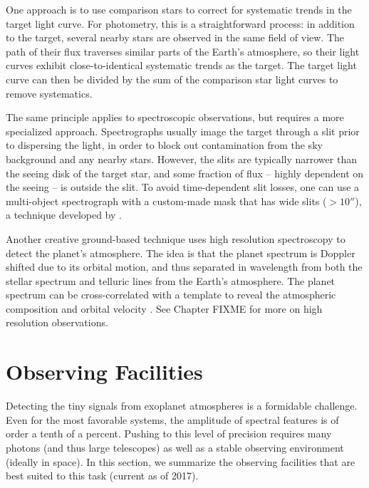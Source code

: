 \documentclass[graybox,natbib,nosecnum]{svmult}
\begin{document}
One approach is to use comparison stars to correct for systematic trends in the target light curve. For photometry, this is a straightforward process: in addition to the target, several nearby stars are observed in the same field of view. The path of their flux traverses similar parts of the Earth's atmosphere, so their light curves exhibit close-to-identical systematic trends as the target. The target light curve can then be divided by the sum of the comparison star light curves to remove systematics.  %

The same principle applies to spectroscopic observations, but requires a more specialized approach.  Spectrographs usually image the target through a slit prior to dispersing the light, in order to block out contamination from the sky background and any nearby stars. However, the slits are typically narrower than the seeing disk of the target star, and some fraction of flux -- highly dependent on the seeing -- is outside the slit.  To avoid time-dependent slit losses, one can use a multi-object spectrograph with a custom-made mask that has wide slits ($>10''$), a technique developed by \cite{bean10}. 


Another creative ground-based technique uses high resolution spectroscopy to detect the planet's atmosphere.  The idea is that the planet spectrum is Doppler shifted due to its orbital motion, and thus separated in wavelength from both the stellar spectrum and telluric lines from the Earth's atmosphere. The planet spectrum can be cross-correlated with a template to reveal the atmospheric composition and orbital velocity \citep[e.g.][]{snellen10}.  See Chapter FIXME for more on high resolution observations. 

\section{Observing Facilities}
Detecting the tiny signals from exoplanet atmospheres is a formidable challenge. Even for the most favorable systems, the amplitude of spectral features is of order a tenth of a percent. Pushing to this level of precision requires many photons (and thus large telescopes) as well as a stable observing environment (ideally in space).  In this section, we summarize the observing facilities that are best suited to this task (current as of 2017).
\end{document}
